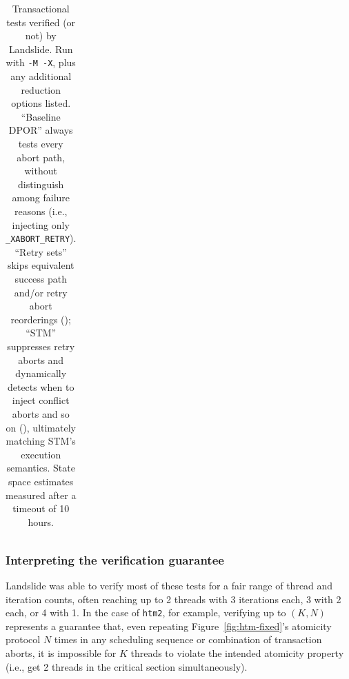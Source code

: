 \begin{table}[p]
\begin{center}
\begin{tabular}{cc||r|r||r|r||r|r}
		\end{tabular}
	\end{center}
	\caption{Transactional tests verified (or not) by Landslide.
		Run with {\tt -M -X}, plus any additional reduction options listed.
		``Baseline DPOR'' always tests every abort path, without distinguish among failure reasons
		(i.e., injecting only {\tt \_XABORT\_RETRY}).
		``Retry sets'' skips equivalent success path and/or retry abort reorderings (\sect{\ref{sec:tm-retrysets}});
		``STM'' suppresses retry aborts and dynamically detects when to inject conflict aborts and so on
		(\sect{\ref{sec:txn-abort-codes}}),
		ultimately matching STM's execution semantics.
		State space estimates measured after a timeout of 10 hours.
		}
	\label{tab:tm-verifs}
\end{table}

\subsubsection{Interpreting the verification guarantee}

Landslide was able to verify most of these tests for a fair range of thread and iteration counts,
often reaching up to 2 threads with 3 iterations each, 3 with 2 each, or 4 with 1.
In the case of {\tt htm2}, for example,
verifying up to $(K, N)$ represents a guarantee that,
even repeating Figure~\ref{fig:htm-fixed}'s atomicity protocol $N$ times
in any scheduling sequence or combination of transaction aborts,
it is impossible for $K$ threads to violate the intended atomicity property
(i.e., get 2 threads in the critical section simultaneously).

